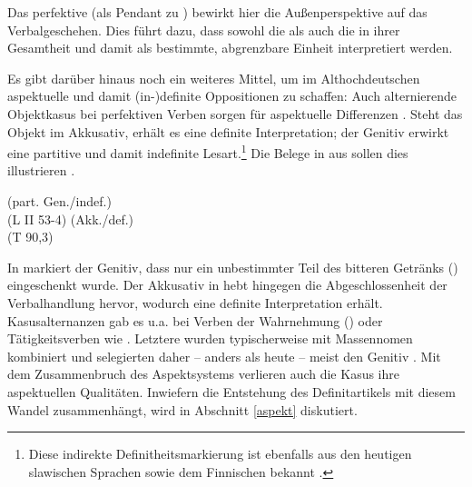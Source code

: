 \noindent
Das perfektive  (als Pendant zu ) bewirkt hier die Außenperspektive auf das Verbalgeschehen. Dies führt dazu, dass sowohl die  als auch die  in ihrer Gesamtheit und damit als bestimmte, abgrenzbare Einheit interpretiert werden. 

Es gibt darüber hinaus noch ein weiteres Mittel, um im Althochdeutschen aspektuelle und damit (in-)definite Oppositionen zu schaffen: Auch alternierende Objektkasus bei perfektiven Verben sorgen für aspektuelle Differenzen  \parencite{Donhauser1990,Leiss1994,Abraham1997,Philippi1997}. Steht das Objekt im Akkusativ, erhält es eine definite Interpretation; der Genitiv erwirkt eine partitive und damit indefinite Lesart.\footnote{Diese indirekte Definitheitsmarkierung ist ebenfalls aus den heutigen slawischen Sprachen sowie dem Finnischen bekannt \parencite[74]{Philippi1997}.} Die Belege in  aus \textcite[65]{Philippi1997} sollen dies illustrieren \parencite[vgl. auch][49]{Ferraresi2014}.

\begin{exe}
	\ex \label{ex:ahd-gen-akk}
		\begin{xlist}
		\ex \label{ex:ahd-gen}   (part. Gen./indef.) \\ 
		 (L II 53-4)
		\ex \label{ex:ahd-akk}   (Akk./def.) \\   (T 90,3)
		\end{xlist}
\end{exe}
\noindent
In  markiert der Genitiv, dass nur ein unbestimmter Teil des bitteren Getränks () eingeschenkt wurde. Der Akkusativ in  hebt hingegen die Abgeschlossenheit der Verbalhandlung hervor, wodurch  eine definite Interpretation erhält. Kasusalternanzen gab es u.a. bei Verben der Wahrnehmung () oder Tätigkeitsverben wie  \parencite[s.][100]{Donhauser1990}. Letztere wurden typischerweise mit Massennomen kombiniert und selegierten daher -- anders als heute --  meist den Genitiv \parencite[36]{Abraham1997}. Mit dem Zusammenbruch des Aspektsystems verlieren auch die Kasus ihre aspektuellen Qualitäten. Inwiefern die Entstehung des Definitartikels mit diesem Wandel zusammenhängt, wird in Abschnitt \ref{aspekt} diskutiert. 
 
